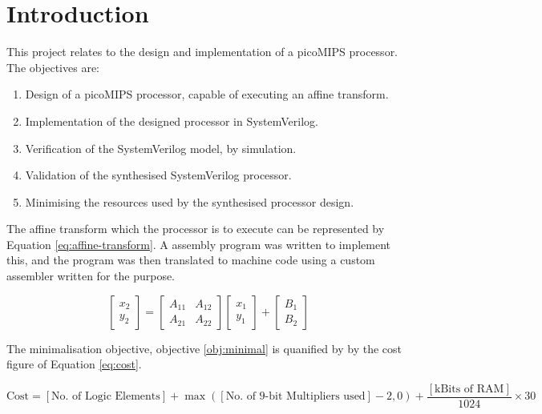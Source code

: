 \section{Introduction} \label{sec:intro}

This project relates to the design and implementation of a picoMIPS processor. The objectives are:
\begin{enumerate}
	\item Design of a picoMIPS processor, capable of executing an affine transform. \label{obj:design}
	\item Implementation of the designed processor in SystemVerilog. \label{obj:imp}
	\item Verification of the SystemVerilog model, by simulation. \label{obj:verif}
	\item Validation of the synthesised SystemVerilog processor. \label{obj:valid}
	\item Minimising the resources used by the synthesised processor design. \label{obj:minimal}
\end{enumerate}

The affine transform which the processor is to execute can be represented by Equation \ref{eq:affine-transform}. A assembly program was written to implement this, and the program was then translated to machine code using a custom assembler written for the purpose.

\begin{equation}
\begin{bmatrix}
x_2\\
y_2
\end{bmatrix}
=
\begin{bmatrix}
A_{11} & A_{12}\\
A_{21} & A_{22}
\end{bmatrix}
\begin{bmatrix}
x_1\\
y_1
\end{bmatrix}
+
\begin{bmatrix}
B_1\\
B_2
\end{bmatrix}
\label{eq:affine-transform}
\end{equation}

The minimalisation objective, objective \ref{obj:minimal} is quanified by by the cost figure of Equation \ref{eq:cost}.

\begin{equation}
	\text{Cost} = [\text{No. of Logic Elements}] + \max([\text{No. of 9-bit Multipliers used}] -2, 0) + \frac{ [\text{kBits of RAM}]}{1024} \times 30
	\label{eq:cost}
\end{equation}

